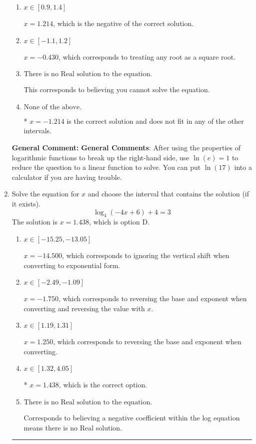\documentclass{extbook}[14pt]
\newcommand{\litem}[1]{\item #1

\rule{\textwidth}{0.4pt}}
\begin{document}
\begin{enumerate}
{\begin{enumerate}[label=\Alph*.]
$x = -11.854$, which corresponds to thinking you don't need to take the natural log of both sides before reducing, as if the right side already has a natural log.
\item \( x \in [0.9, 1.4] \)

$x = 1.214$, which is the negative of the correct solution.
\item \( x \in [-1.1, 1.2] \)

$x = -0.430$, which corresponds to treating any root as a square root.
\item \( \text{There is no Real solution to the equation.} \)

This corresponds to believing you cannot solve the equation.
\item \( \text{None of the above.} \)

* $x = -1.214$ is the correct solution and does not fit in any of the other intervals.
\end{enumerate}

\textbf{General Comment:} \textbf{General Comments}: After using the properties of logarithmic functions to break up the right-hand side, use $\ln(e) = 1$ to reduce the question to a linear function to solve. You can put $\ln(17)$ into a calculator if you are having trouble.
}
\litem{
Solve the equation for $x$ and choose the interval that contains the solution (if it exists).
\[ \log_{4}{(-4x+6)}+4 = 3 \]The solution is \( x = 1.438 \), which is option D.\begin{enumerate}[label=\Alph*.]
\item \( x \in [-15.25, -13.05] \)

$x = -14.500$, which corresponds to ignoring the vertical shift when converting to exponential form.
\item \( x \in [-2.49, -1.09] \)

$x = -1.750$, which corresponds to reversing the base and exponent when converting and reversing the value with $x$.
\item \( x \in [1.19, 1.31] \)

$x = 1.250$, which corresponds to reversing the base and exponent when converting.
\item \( x \in [1.32, 4.05] \)

* $x = 1.438$, which is the correct option.
\item \( \text{There is no Real solution to the equation.} \)

Corresponds to believing a negative coefficient within the log equation means there is no Real solution.
\end{enumerate}

}
\end{enumerate}
\end{document}
